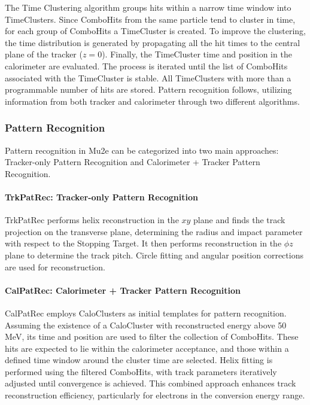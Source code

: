The Time Clustering algorithm groups hits within a narrow time window into TimeClusters. 
Since ComboHits from the same particle tend to cluster in time, for each group of ComboHits a 
TimeCluster is created. To improve the clustering, the time distribution is generated by 
propagating all the hit times to the central plane of the tracker ($z=0$). Finally, the 
TimeCluster time and position in the calorimeter are evaluated. The process is iterated 
until the list of ComboHits associated with the TimeCluster is stable. All TimeClusters with 
more than a programmable number of hits are stored. Pattern recognition follows, utilizing 
information from both tracker and calorimeter through two different algorithms.
\subsubsection{Pattern Recognition}

Pattern recognition in Mu2e can be categorized into two main approaches: 
Tracker-only Pattern Recognition and Calorimeter + Tracker Pattern Recognition.

\paragraph{TrkPatRec: Tracker-only Pattern Recognition}

TrkPatRec performs helix reconstruction in the $xy$ plane and finds the 
track projection on the transverse plane, determining the radius and impact 
parameter with respect to the Stopping Target. It then performs reconstruction 
in the $\phi z$ plane to determine the track pitch. Circle fitting and angular 
position corrections are used for reconstruction.

\paragraph{CalPatRec: Calorimeter + Tracker Pattern Recognition}

CalPatRec employs CaloClusters as initial templates for pattern 
recognition. Assuming the existence of a CaloCluster with reconstructed 
energy above 50 MeV, its time and position are used to filter the collection of 
ComboHits. These hits are expected to lie within the calorimeter acceptance, 
and those within a defined time window around the cluster time are selected. 
Helix fitting is performed using the filtered ComboHits, with track parameters 
iteratively adjusted until convergence is achieved. This combined approach 
enhances track reconstruction efficiency, particularly for electrons in the conversion energy range.

